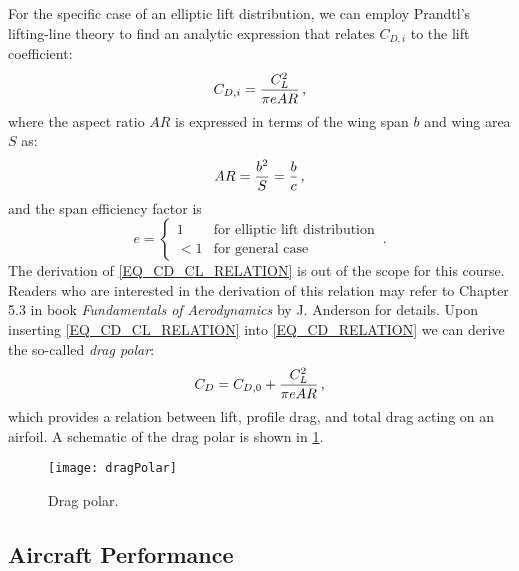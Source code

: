 For the specific case of an elliptic lift distribution, we can employ Prandtl's lifting-line theory to find an analytic expression that relates $C_{D,i}$ to the lift coefficient:
\begin{equation}
  \label{EQ_CD_CL_RELATION}
  C_{D,i} = {\frac{C^2_L}{\pi e AR}} \, \text{,}
\end{equation}
where the aspect ratio $AR$ is expressed in terms of the wing span $b$ and wing area $S$ as:
\begin{equation}
  AR = {\frac{b^2}{S}}={\frac{b}{c}} \,,
\end{equation}
and the span efficiency factor is 
\begin{equation}
e = \begin{cases} 1 & \text{for elliptic lift distribution}\\
                             <1 & \text{for general case}
      \end{cases} \, \text{.}
\end{equation}
The derivation of \cref{EQ_CD_CL_RELATION} is out of the scope for this course. Readers who are interested in the derivation of this relation may refer to Chapter 5.3 in book \emph{Fundamentals of Aerodynamics} by J. Anderson for details. Upon inserting \cref{EQ_CD_CL_RELATION} into \cref{EQ_CD_RELATION} we can derive the so-called {\it drag polar}:
\begin{equation}
C_D = C_{D,0} + {\frac{C^2_L}{\pi e AR}} \, \text{,}
\end{equation}
which provides a relation between lift, profile drag, and total drag acting on an airfoil. A schematic of the drag polar is shown in \cref{FIG_DRAG_POLAR}.

\begin{figure}[!h!]
\begin{center}
 \texttt{[image: dragPolar]}
 \caption{\label{FIG_DRAG_POLAR}Drag polar.}
\end{center}
\end{figure}

\subsection{Aircraft Performance}


